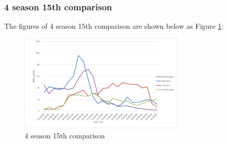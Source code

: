 \documentclass[a4paper,12pt,reqno]{article}
\begin{document}
    \subsubsection*{4 season 15th comparison}
        The figures of 4 season 15th comparison are shown below 
        as Figure \ref{fig:4_season_15th_comparison}:
        \begin{figure}[H]
            \centering
            \includegraphics[width=0.7\textwidth]{figures/figure2.png}
            \caption{4 season 15th comparison}
            \label{fig:4_season_15th_comparison}
        \end{figure}
\newpage



\end{document}
